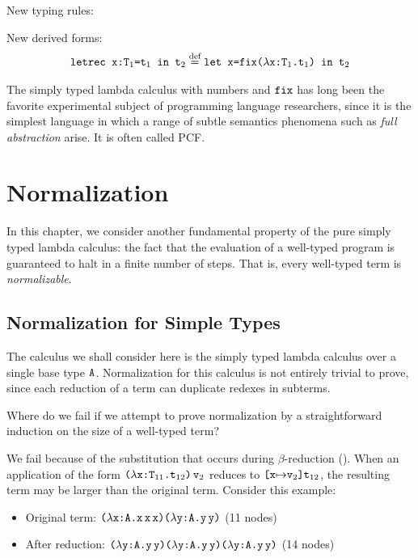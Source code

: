 \documentclass[11pt,twoside=off,numbers=noenddot]{scrbook}
\begin{document}
New typing rules:
\begin{prooftree}
\end{prooftree}

New derived forms:
\begin{align*}
  \ttt{letrec x:$\ttt{T}_1$=$\ttt{t}_1$ in $\ttt{t}_2$} \overset{\text{def}}{=}
  \ttt{let x=fix($\lambda$x:$\ttt{T}_1$.$\ttt{t}_1$) in $\ttt{t}_2$}
\end{align*}

The simply typed lambda calculus with numbers and $\ttt{fix}$ has
long been the favorite experimental subject of programming language
researchers, since it is the simplest language in which a range of
subtle semantics phenomena such as \textit{full abstraction} arise.
It is often called PCF.

\chapter{Normalization}
In this chapter, we consider another fundamental property of the pure
simply typed lambda calculus: the fact that the evaluation of a
well-typed program is guaranteed to halt in a finite number of steps.
That is, every well-typed term is \textit{normalizable}.

\section{Normalization for Simple Types}
The calculus we shall consider here is the simply typed lambda
calculus over a single base type $\ttt{A}$. Normalization for this
calculus is not entirely trivial to prove, since each reduction of a
term can duplicate redexes in subterms.

\begin{exercise}
  Where do we fail if we attempt to prove normalization by a
  straightforward induction on the size of a well-typed term?

  We fail because of the substitution that occurs during
  $\beta$-reduction (). When an application of the
  form $\ttt{($\lambda$x:$\ttt{T}_{11}$.$\ttt{t}_{12}$)\,$\ttt{v}_2$}$
  reduces to $\ttt{[x$\mapsto$$\ttt{v}_2$]}\ttt{t}_{12}$, the
  resulting term may be larger than the original term. Consider this example:
  \begin{itemize}
    \item Original term:
      $\ttt{($\lambda$x:A.x\,x\,x)($\lambda$y:A.y\,y)}$ (11 nodes)
    \item After reduction:
      $\ttt{($\lambda$y:A.y\,y)($\lambda$y:A.y\,y)($\lambda$y:A.y\,y)}$
      (14 nodes)
  \end{itemize}
\end{exercise}
\end{document}
